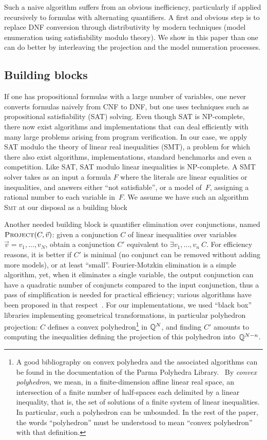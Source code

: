 Such a naive algorithm suffers from an obvious inefficiency, particularly if applied recursively to formulas with alternating quantifiers. A first and obvious step is to replace DNF conversion through distributivity by modern techniques (model enumeration using satisfiability modulo theory). We show in this paper than one can do better by interleaving the projection and the model numeration processes.

\subsection{Building blocks}
If one has propositional formulas with a large number of variables, one never converts formulas naively from CNF to DNF, but one uses techniques such as propositional satisfiability (SAT) solving. Even though SAT is NP-complete, there now exist algorithms and implementations that can deal efficiently with many large problems arising from program verification. In our case, we apply SAT modulo the theory of linear real inequalities (SMT), a problem for which there also exist algorithms, implementations, standard benchmarks and even a competition. Like SAT, SAT modulo linear inequalities is NP-complete. A SMT solver takes as an input a formula $F$ where the literals are linear equalities or inequalities, and answers either ``not satisfiable'', or a model of~$F$, assigning a rational number to each variable in~$F$. We assume we have such an algorithm \textsc{Smt} at our disposal as a building block

Another needed building block is quantifier elimination over conjunctions, named $\textsc{Project}(C, \vec{v})$: given a conjunction $C$ of linear inequalities over variables $\vec{v} = v_1, \dots, v_N$, obtain a conjunction $C'$ equivalent to $\exists v_1,\dots,v_n~C$. For efficiency reasons, it is better if $C'$ is minimal (no conjunct can be removed without adding more models), or at least ``small''. Fourier-Motzkin elimination is a simple algorithm, yet, when it eliminates a single variable, the output conjunction can have a quadratic number of conjuncts compared to the input conjunction, thus a pass of simplification is needed for practical efficiency; various algorithms have been proposed in that respect~\cite{imbert93fouriers}.
For our implementations, we used ``black box'' libraries implementing
geometrical transformations, in particular polyhedron projection: $C$ defines a convex polyhedron\footnote{A good bibliography on convex polyhedra and the associated algorithms can be found in the documentation of the Parma Polyhedra Library.~\cite{PPL} By \emph{convex polyhedron}, we mean, in a finite-dimension affine linear real space, an intersection of a finite number of half-spaces each delimited by a linear inequality, that is, the set of solutions of a finite system of linear inequalities. In particular, such a polyhedron can be unbounded. In the rest of the paper, the words ``polyhedron'' must be understood to mean ``convex polyhedron'' with that definition.} in $\mathbb{Q}^N$, and finding $C'$ amounts to computing the inequalities defining the projection of this polyhedron into~$\mathbb{Q}^{N-n}$.

